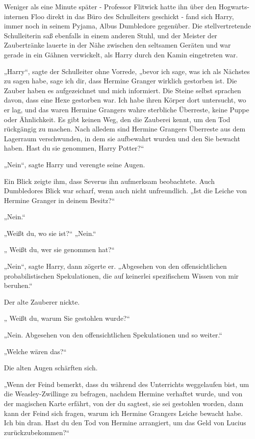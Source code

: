 {Weniger als eine Minute später - Professor Flitwick hatte ihn über den Hogwarts-internen Floo direkt in das Büro des Schulleiters geschickt - fand sich Harry, immer noch in seinem Pyjama, Albus Dumbledore gegenüber. Die stellvertretende Schulleiterin saß ebenfalls in einem anderen Stuhl, und der Meister der Zaubertränke lauerte in der Nähe zwischen den seltsamen Geräten und war gerade in ein Gähnen verwickelt, als Harry durch den Kamin eingetreten war.

„Harry“, sagte der Schulleiter ohne Vorrede, „bevor ich sage, was ich als Nächstes zu sagen habe, sage ich dir, dass Hermine Granger wirklich gestorben ist. Die Zauber haben es aufgezeichnet und mich informiert. Die Steine selbst sprachen davon, dass eine Hexe gestorben war. Ich habe ihren Körper dort untersucht, wo er lag, und das waren Hermine Grangers wahre sterbliche Überreste, keine Puppe oder Ähnlichkeit. Es gibt keinen Weg, den die Zauberei kennt, um den Tod rückgängig zu machen. Nach alledem sind Hermine Grangers Überreste aus dem Lagerraum verschwunden, in dem sie aufbewahrt wurden und den Sie bewacht haben. Hast du sie genommen, Harry Potter?“

„Nein“, sagte Harry und verengte seine Augen.

Ein Blick zeigte ihm, dass Severus ihn aufmerksam beobachtete. Auch Dumbledores Blick war scharf, wenn auch nicht unfreundlich. „Ist die Leiche von Hermine Granger in deinem Besitz?“

„Nein.“

„Weißt du, wo sie ist?“ „Nein.“

„ Weißt du, wer sie genommen hat?“

„Nein“, sagte Harry, dann zögerte er. „Abgesehen von den offensichtlichen probabilistischen Spekulationen, die auf keinerlei spezifischem Wissen von mir beruhen.“

Der alte Zauberer nickte.

„ Weißt du, warum Sie gestohlen wurde?“

„Nein. Abgesehen von den offensichtlichen Spekulationen und so weiter.“

„Welche wären das?“

Die alten Augen schärften sich.

„Wenn der Feind bemerkt, dass du während des Unterrichts weggelaufen bist, um die Weasley-Zwillinge zu befragen, nachdem Hermine verhaftet wurde, und von der magischen Karte erfährt, von der du sagtest, sie sei gestohlen worden, dann kann der Feind sich fragen, warum ich Hermine Grangers Leiche bewacht habe. Ich bin dran. Hast du den Tod von Hermine arrangiert, um das Geld von Lucius zurückzubekommen?“

}
